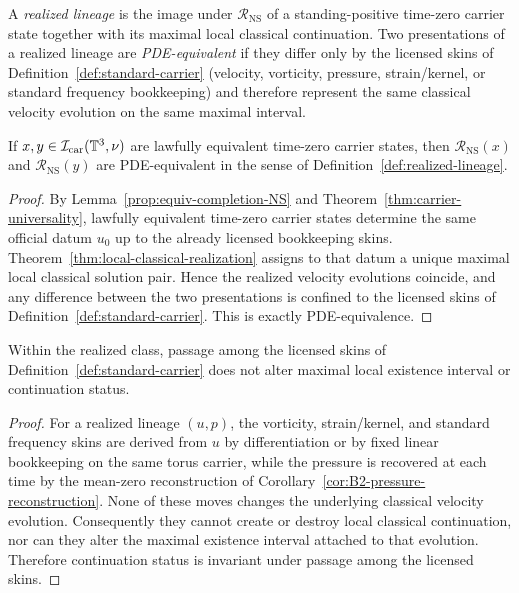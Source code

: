 \begin{definition}\label{def:realized-lineage}
A \emph{realized lineage} is the image under $\mathcal R_{\mathrm{NS}}$ of a standing-positive time-zero
carrier state together with its maximal local classical continuation.
Two presentations of a realized lineage are \emph{PDE-equivalent} if they differ only by the licensed
skins of Definition~\ref{def:standard-carrier} (velocity, vorticity, pressure, strain/kernel, or
standard frequency bookkeeping) and therefore represent the same classical velocity evolution on the
same maximal interval.
\end{definition}

\begin{lemma}\label{lem:redescription-commutes-with-realization}
If $x,y\in\mathcal I_{\mathrm{car}}(\mathbb{T}^3,\nu)$ are lawfully equivalent time-zero carrier states, then
$\mathcal R_{\mathrm{NS}}(x)$ and $\mathcal R_{\mathrm{NS}}(y)$ are PDE-equivalent in the sense of
Definition~\ref{def:realized-lineage}.
\end{lemma}

\begin{proof}
By Lemma~\ref{prop:equiv-completion-NS} and Theorem~\ref{thm:carrier-universality}, lawfully
equivalent time-zero carrier states determine the same official datum $u_0$ up to the already
licensed bookkeeping skins. Theorem~\ref{thm:local-classical-realization} assigns to that datum a
unique maximal local classical solution pair. Hence the realized velocity evolutions coincide, and
any difference between the two presentations is confined to the licensed skins of
Definition~\ref{def:standard-carrier}. This is exactly PDE-equivalence.
\end{proof}

\begin{lemma}\label{lem:continuation-skin-invariant}
Within the realized class, passage among the licensed skins of Definition~\ref{def:standard-carrier}
does not alter maximal local existence interval or continuation status.
\end{lemma}

\begin{proof}
For a realized lineage $(u,p)$, the vorticity, strain/kernel, and standard frequency skins are derived
from $u$ by differentiation or by fixed linear bookkeeping on the same torus carrier, while the
pressure is recovered at each time by the mean-zero reconstruction of Corollary~\ref{cor:B2-pressure-reconstruction}. None of
these moves changes the underlying classical velocity evolution. Consequently they cannot create or
destroy local classical continuation, nor can they alter the maximal existence interval attached to
that evolution. Therefore continuation status is invariant under passage among the licensed skins.
\end{proof}

